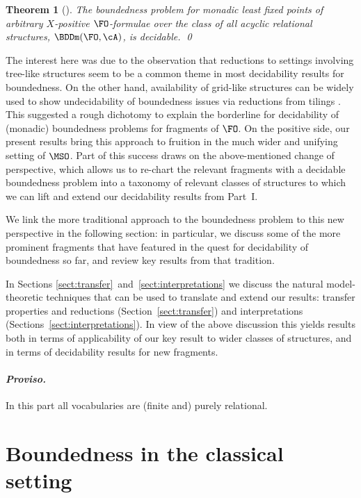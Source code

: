 \documentclass{LMCS}
\newtheorem*{thm*}{Theorem}
\begin{document}
\begin{thm*}[\cite{KOS}]
The boundedness problem for monadic least fixed points
of arbitrary $X$-positive $\FO$-formulae over the class of all
acyclic relational structures, $\BDDm(\FO,\cA)$, is decidable.
\qed\end{thm*}

The interest here was due to the observation
that reductions to settings involving tree-like structures seem to
be a common theme in most decidability results for boundedness.
On the other hand, availability of grid-like structures can
be widely used to show undecidability of boundedness issues via
reductions from tilings \cite{KOunpub}.
This suggested a rough dichotomy to
explain the borderline for decidability of (monadic)
boundedness problems for fragments of $\FO$.
On the positive side, our present results bring this approach
to fruition in the much wider and unifying setting of $\MSO$.
Part of this success draws on the above-mentioned
change of perspective, which allows us to re-chart the
relevant fragments with a decidable boundedness problem
into a taxonomy of relevant classes of structures
to which we can lift and extend our decidability results
from Part~I.


We link the more traditional approach to
the boundedness problem to this new perspective
in the following section\?: in particular, we discuss some of
the more prominent fragments that have featured in the quest
for decidability of boundedness so far, and review key results
from that tradition.

In Sections \ref{sect:transfer}~and~\ref{sect:interpretations} we discuss the natural model-theoretic
techniques that can be used to translate and extend our results\?:
transfer properties and reductions (Section~\ref{sect:transfer})
and interpretations (Sections~\ref{sect:interpretations}).
In view of the above discussion this yields results both
in terms of applicability of our key result to
wider classes of structures, and in terms of decidability results
for new fragments.

\medskip
\paragraph*{\itshape Proviso.}
In this part all vocabularies are (finite and) purely relational.


\section{Boundedness in the classical setting}
\label{sect:classical boundedness}
\label{sect:start II}
\end{document}
